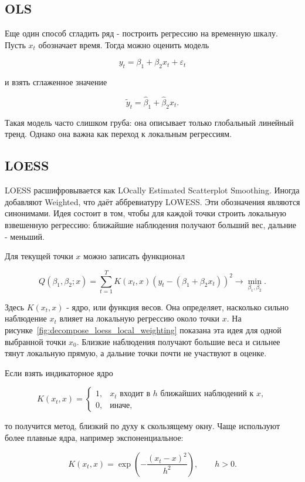 \documentclass[12pt,fleqn]{article}
\begin{document}
\subsection{OLS}


Еще один способ сгладить ряд - построить регрессию на временную шкалу.
Пусть \(x_t\) обозначает время.
Тогда можно оценить модель

\[
y_t = \beta_1+\beta_2 x_t+\varepsilon_t
\]

и взять сглаженное значение

\[
\tilde y_t=\hat\beta_1+\hat\beta_2 x_t.
\]

Такая модель часто слишком груба: она описывает только глобальный линейный тренд.
Однако она важна как переход к локальным регрессиям.


\subsection{LOESS}


LOESS расшифровывается как LOcally Estimated Scatterplot Smoothing. 
Иногда добавляют Weighted, что даёт аббревиатуру LOWESS. Эти обозначения являются синонимами.
Идея состоит в том, чтобы для каждой точки строить локальную взвешенную регрессию: ближайшие наблюдения получают больший вес, дальние - меньший.

Для текущей точки \(x\) можно записать функционал

\[
Q(\beta_1,\beta_2;x)
=
\sum_{t=1}^T
K(x_t,x)
\left(
y_t-(\beta_1+\beta_2 x_t)
\right)^2 \to \min_{\beta_1,\beta_2}.
\]

Здесь \(K(x_t,x)\) - ядро, или функция весов.
Она определяет, насколько сильно наблюдение \(x_t\) влияет на локальную регрессию около точки \(x\).
На рисунке~\ref{fig:decompose_loess_local_weighting} показана эта идея для одной выбранной точки \(x_0\).
Близкие наблюдения получают большие веса и сильнее тянут локальную прямую, а дальние точки почти не участвуют в оценке.

Если взять индикаторное ядро

\[
K(x_t,x)=
\begin{cases}
1, & x_t \text{ входит в } h \text{ ближайших наблюдений к } x,\\
0, & \text{иначе},
\end{cases}
\]

то получится метод, близкий по духу к скользящему окну.
Чаще используют более плавные ядра, например экспоненциальное:

\[
K(x_t,x)
=
\exp\left(
-\frac{(x_t-x)^2}{h^2}
\right),
\qquad h>0.
\]
\end{document}
